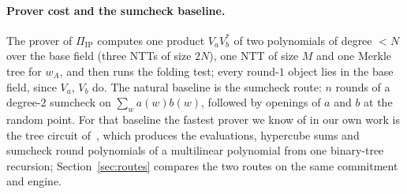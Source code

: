 \documentclass[11pt]{article}
\theoremstyle{definition}
\begin{document}
\paragraph{Prover cost and the sumcheck baseline.}
The prover of $\Pi_{\mathrm{IP}}$ computes one product $V_aV_b^\ast$ of two polynomials of degree $<N$ over the base field (three NTTs of size $2N$), one NTT of size $M$ and one Merkle tree for $w_A$, and then runs the folding test; every round-$1$ object lies in the base field, since $V_a$, $V_b$ do.
The natural baseline is the sumcheck route: $n$ rounds of a degree-$2$ sumcheck on $\sum_wa(w)b(w)$, followed by openings of $a$ and $b$ at the random point.
For that baseline the fastest prover we know of in our own work is the tree circuit of~\cite{MI26}, which produces the evaluations, hypercube sums and sumcheck round polynomials of a multilinear polynomial from one binary-tree recursion; Section~\ref{sec:routes} compares the two routes on the same commitment and engine.
\end{document}
